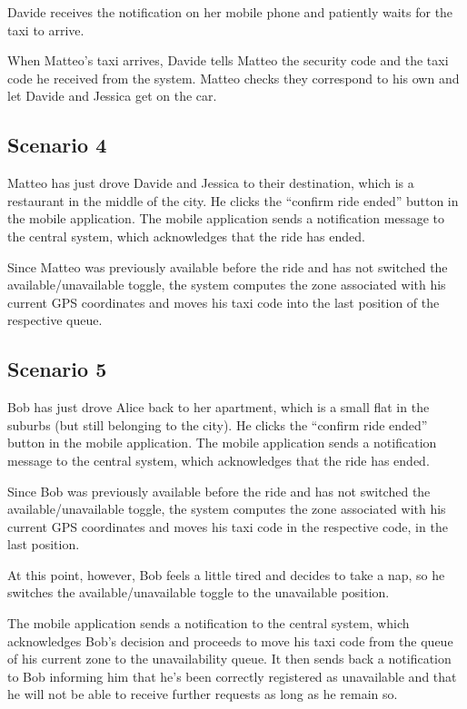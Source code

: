Davide receives the notification on her mobile phone and patiently waits for the taxi to arrive.

When Matteo’s taxi arrives, Davide tells Matteo the security code and the taxi code he received from the system. Matteo checks they correspond to his own and let Davide and Jessica get on the car.


\subsection{Scenario 4}
Matteo has just drove Davide and Jessica to their destination, which is a restaurant in the middle of the city. He clicks the “confirm ride ended” button in the mobile application. The mobile application sends a notification message to the central system, which acknowledges that the ride has ended.

Since Matteo was previously available before the ride and has not switched the available/unavailable toggle, the system computes the zone associated with his current GPS coordinates and moves his taxi code into the last position of the respective queue.


\subsection{Scenario 5}
Bob has just drove Alice back to her apartment, which is a small flat in the suburbs (but still belonging to the city). He clicks the “confirm ride ended” button in the mobile application. The mobile application sends a notification message to the central system, which acknowledges that the ride has ended.

Since Bob was previously available before the ride and has not switched the available/unavailable toggle, the system computes the zone associated with his current GPS coordinates and moves his taxi code in the respective code, in the last position.

At this point, however, Bob feels a little tired and decides to take a nap, so he switches the available/unavailable toggle to the unavailable position.

The mobile application sends a notification to the central system, which acknowledges Bob’s decision and proceeds to move his taxi code from the queue of his current zone to the unavailability queue. It then sends back a notification to Bob informing him that he’s been correctly registered as unavailable and that he will not be able to receive further requests as long as he remain so.

